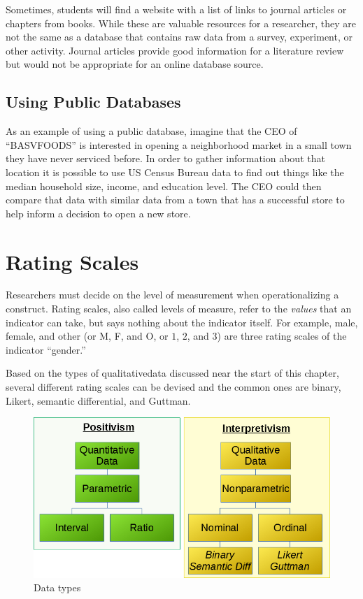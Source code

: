 Sometimes, students will find a website with a list of links to journal articles or chapters from books. While these are valuable resources for a researcher, they are not the same as a database that contains raw data from a survey, experiment, or other activity. Journal articles provide good information for a literature review but would not be appropriate for an online database source.

\subsection{Using Public Databases}

As an example of using a public database, imagine that the CEO of ``BASVFOODS'' is interested in opening a neighborhood market in a small town they have never serviced before. In order to gather information about that location it is possible to use US Census Bureau data to find out things like the median household size, income, and education level. The CEO could then compare that data with similar data from a town that has a successful store to help inform a decision to open a new store.

\section{Rating Scales}

Researchers must decide on the level of measurement when operationalizing a construct. Rating scales, also called levels of measure, refer to the \textit{values} that an indicator can take, but says nothing about the indicator itself. For example, male, female, and other (or M, F, and O, or $ 1 $, $ 2 $, and $ 3 $) are three rating scales of the indicator ``gender.'' 

Based on the types of \gls{qualitativedata} discussed near the start of this chapter, several different rating scales can be devised and the common ones are binary, Likert, semantic differential, and Guttman. 

\begin{figure}[H]
	\centering
	\includegraphics[width=\maxwidth{.95\linewidth}]{gfx/06-DataTypes}
	\caption{Data types}
	\label{fig06.04}
\end{figure}

